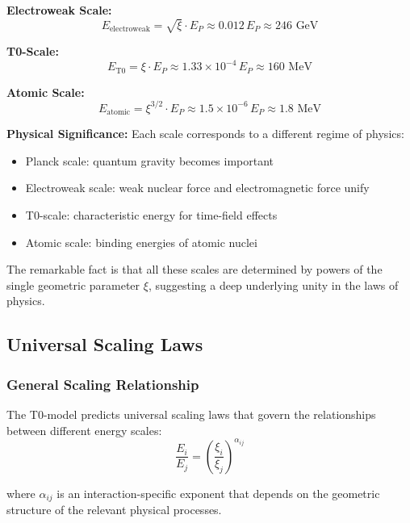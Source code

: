 \documentclass[12pt,a4paper]{article}
\begin{document}
	\textbf{Electroweak Scale:}
	\begin{equation}
		E_{\text{electroweak}} = \sqrt{\xi} \cdot E_P \approx 0.012 \, E_P \approx 246 \text{ GeV}
	\end{equation}
	
	\textbf{T0-Scale:}
	\begin{equation}
		E_{\text{T0}} = \xi \cdot E_P \approx 1.33 \times 10^{-4} \, E_P \approx 160 \text{ MeV}
	\end{equation}
	
	\textbf{Atomic Scale:}
	\begin{equation}
		E_{\text{atomic}} = \xi^{3/2} \cdot E_P \approx 1.5 \times 10^{-6} \, E_P \approx 1.8 \text{ MeV}
	\end{equation}
	
	\textbf{Physical Significance:} Each scale corresponds to a different regime of physics:
	\begin{itemize}
		\item Planck scale: quantum gravity becomes important
		\item Electroweak scale: weak nuclear force and electromagnetic force unify
		\item T0-scale: characteristic energy for time-field effects
		\item Atomic scale: binding energies of atomic nuclei
	\end{itemize}
	
	The remarkable fact is that all these scales are determined by powers of the single geometric parameter $\xi$, suggesting a deep underlying unity in the laws of physics.
	
	\subsection{Universal Scaling Laws}
	
	\subsubsection{General Scaling Relationship}
	
	The T0-model predicts universal scaling laws that govern the relationships between different energy scales:
	\begin{equation}
		\frac{E_i}{E_j} = \left(\frac{\xi_i}{\xi_j}\right)^{\alpha_{ij}}
	\end{equation}
	
	where $\alpha_{ij}$ is an interaction-specific exponent that depends on the geometric structure of the relevant physical processes.
	
\end{document}
